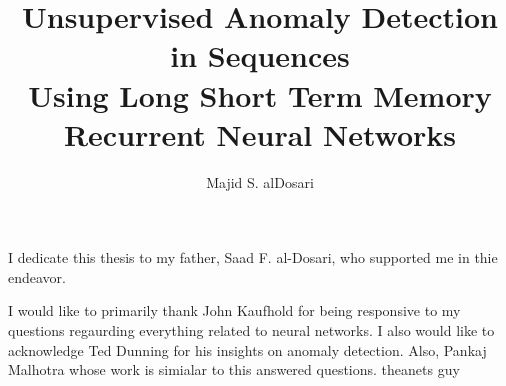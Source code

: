 \documentclass[11 pt]{report}
\begin{document}
\title{
  Unsupervised Anomaly Detection in Sequences\\
  Using Long Short Term Memory \\
  Recurrent Neural Networks} %
\author{
Majid S. alDosari
}
\subject{(Computational Science)}







\signaturepage

\titlepage

\copyrightpage


\dedicationpage

\noindent I dedicate this thesis to my father, Saad F. al-Dosari, who supported me in thie endeavor.


\acknowledgementspage

\noindent
I would like to primarily thank John Kaufhold for being responsive to my questions regaurding everything related to neural networks. I also would like to acknowledge Ted Dunning for his insights on anomaly detection. Also, Pankaj Malhotra whose work is simialar to this answered questions. theanets guy
\end{document}

